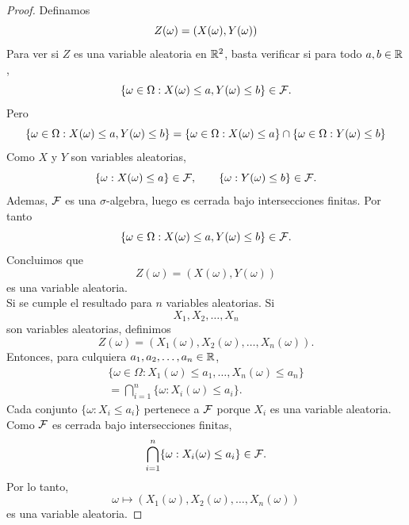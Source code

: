 \documentclass[12pt,a4paper]{article}
\begin{document}
    \begin{proof}
        Definamos
        \begin{equation*}
            Z(\omega)=(X(\omega),Y(\omega))
        \end{equation*}
        Para ver si $Z$ es una variable aleatoria en $\mathbb{R}^{2}$, basta verificar si para todo $a,b\in\mathbb{R}$,
        \begin{equation*}
            \{\omega\in \Omega:X(\omega)\leq a, Y(\omega)\leq b\}\in\mathcal{F}.
        \end{equation*}
        Pero
        \begin{equation*}
            \{\omega\in \Omega:X(\omega)\leq a, Y(\omega)\leq b\}=\{\omega\in \Omega:X(\omega)\leq a\}\cap\{\omega\in\Omega:Y(\omega)\leq b\}
        \end{equation*}
        Como $X$ y $Y$ son variables aleatorias,
        \begin{equation*}
            \{\omega:X(\omega)\leq a\}\in\mathcal{F},\qquad\{\omega:Y(\omega)\leq b\}\in\mathcal{F}.
        \end{equation*}
        Ademas, $\mathcal{F}$ es una $\sigma$-algebra, luego es cerrada bajo intersecciones finitas. Por tanto
        \begin{equation*}
            \{\omega\in \Omega:X(\omega)\leq a, Y(\omega)\leq b\}\in\mathcal{F}.
        \end{equation*}
        Concluimos que
        \begin{equation*}
            Z(\omega)=(X(\omega),Y(\omega))
        \end{equation*}
        es una variable aleatoria.\\
        Si se cumple el resultado para $n$ variables aleatorias. Si
        \begin{equation*}
            X_{1},X_{2},\dots,X_{n}
        \end{equation*}
        son variables aleatorias, definimos
        \begin{equation*}
            Z(\omega)=(X_{1}(\omega),X_{2}(\omega),\dots,X_{n}(\omega)).
        \end{equation*}
        Entonces, para culquiera $a_{1},a_{2},\dots,a_{n}\in\mathbb{R}$,
        \begin{align*}
            \{\omega\in\Omega:X_{1}(\omega)\leq a_{1},\dots,X_{n}(\omega)\leq a_{n}\}\\
            =\bigcap_{i=1}^{n}\{\omega:X_{i}(\omega)\leq a_{i}\}.
        \end{align*}
        Cada conjunto $\{\omega:X_{i}\leq a_{i}\}$ pertenece a $\mathcal{F}$ porque $X_{i}$ es una variable aleatoria.
        Como $\mathcal{F}$ es cerrada bajo intersecciones finitas,
        \begin{equation*}
            \bigcap_{i=1}^{n}\{\omega:X_{i}(\omega)\leq a_{i}\}\in\mathcal{F}.
        \end{equation*}
        Por lo tanto,
        \begin{equation*}
            \omega\longmapsto(X_{1}(\omega),X_{2}(\omega),\dots,X_{n}(\omega))
        \end{equation*}
        es una variable aleatoria.
    \end{proof}
\end{document}
